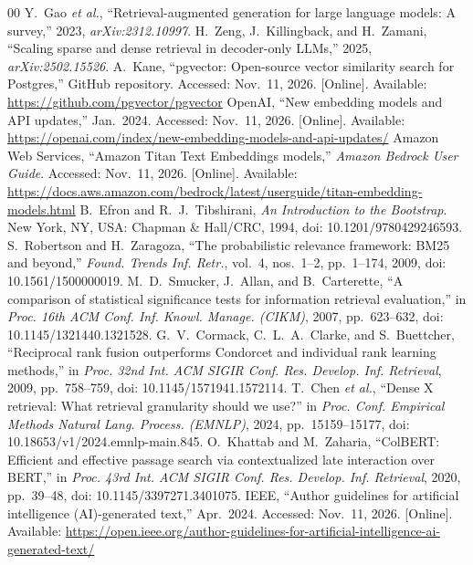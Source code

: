 \documentclass{ieeeaccess}
\makeatletter
\DeclareRobustCommand{\_}{\ifmmode\nfss@text{\textunderscore}\else\textunderscore\allowbreak\fi}
\makeatother
\begin{document}
\begin{thebibliography}{00}
Y.~Gao \emph{et al.}, ``Retrieval-augmented generation for large language models: A survey,'' 2023, \emph{arXiv:2312.10997}.
H.~Zeng, J.~Killingback, and H.~Zamani, ``Scaling sparse and dense retrieval in decoder-only LLMs,'' 2025, \emph{arXiv:2502.15526}.
A.~Kane, ``pgvector: Open-source vector similarity search for Postgres,'' GitHub repository. Accessed: Nov.~11, 2026. [Online]. Available: \url{https://github.com/pgvector/pgvector}
OpenAI, ``New embedding models and API updates,'' Jan.~2024. Accessed: Nov.~11, 2026. [Online]. Available: \url{https://openai.com/index/new-embedding-models-and-api-updates/}
Amazon Web Services, ``Amazon Titan Text Embeddings models,'' \emph{Amazon Bedrock User Guide}. Accessed: Nov.~11, 2026. [Online]. Available: \url{https://docs.aws.amazon.com/bedrock/latest/userguide/titan-embedding-models.html}
B.~Efron and R.~J.~Tibshirani, \emph{An Introduction to the Bootstrap}. New York, NY, USA: Chapman \& Hall/CRC, 1994, doi: 10.1201/9780429246593.
S.~Robertson and H.~Zaragoza, ``The probabilistic relevance framework: BM25 and beyond,'' \emph{Found. Trends Inf. Retr.}, vol.~4, nos.~1--2, pp.~1--174, 2009, doi: 10.1561/1500000019.
M.~D.~Smucker, J.~Allan, and B.~Carterette, ``A comparison of statistical significance tests for information retrieval evaluation,'' in \emph{Proc. 16th ACM Conf. Inf. Knowl. Manage. (CIKM)}, 2007, pp.~623--632, doi: 10.1145/1321440.1321528.
G.~V.~Cormack, C.~L.~A.~Clarke, and S.~Buettcher, ``Reciprocal rank fusion outperforms Condorcet and individual rank learning methods,'' in \emph{Proc. 32nd Int. ACM SIGIR Conf. Res. Develop. Inf. Retrieval}, 2009, pp.~758--759, doi: 10.1145/1571941.1572114.
T.~Chen \emph{et al.}, ``Dense X retrieval: What retrieval granularity should we use?'' in \emph{Proc. Conf. Empirical Methods Natural Lang. Process. (EMNLP)}, 2024, pp.~15159--15177, doi: 10.18653/v1/2024.emnlp-main.845.
O.~Khattab and M.~Zaharia, ``ColBERT: Efficient and effective passage search via contextualized late interaction over BERT,'' in \emph{Proc. 43rd Int. ACM SIGIR Conf. Res. Develop. Inf. Retrieval}, 2020, pp.~39--48, doi: 10.1145/3397271.3401075.
IEEE, ``Author guidelines for artificial intelligence (AI)-generated text,'' Apr.~2024. Accessed: Nov.~11, 2026. [Online]. Available: \url{https://open.ieee.org/author-guidelines-for-artificial-intelligence-ai-generated-text/}
\end{thebibliography}
\end{document}
